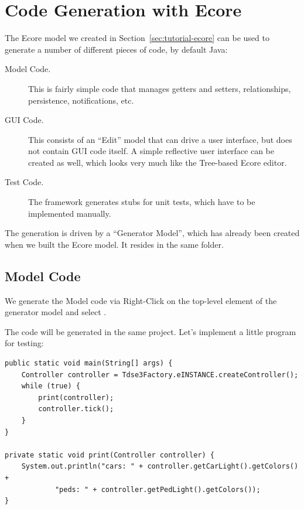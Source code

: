 \section{Code Generation with Ecore}

The Ecore model we created in Section~\ref{sec:tutorial-ecore} can be used to generate a number of different pieces of code, by default Java:

\begin{description}
\item[Model Code.] This is fairly simple code that manages getters and setters, relationships, persistence, notifications, etc.
\item[GUI Code.] This consists of an ``Edit'' model that can drive a user interface, but does not contain GUI code itself.  A simple reflective user interface can be created as well, which looks very much like the Tree-based Ecore editor.
\item[Test Code.] The framework generates stubs for unit tests, which have to be implemented manually.
\end{description}

The generation is driven by a ``Generator Model'', which has already been created when we built the Ecore model.  It resides in the same folder.

\subsection{Model Code}

We generate the Model code via Right-Click on the top-level element of the generator model and select .

The code will be generated in the same project.  Let's implement a little program for testing:
\begin{lstlisting}
public static void main(String[] args) {
	Controller controller = Tdse3Factory.eINSTANCE.createController();
	while (true) {
		print(controller);
		controller.tick();
	}
}

private static void print(Controller controller) {
	System.out.println("cars: " + controller.getCarLight().getColors() +
			"peds: " + controller.getPedLight().getColors());
}
\end{lstlisting}

